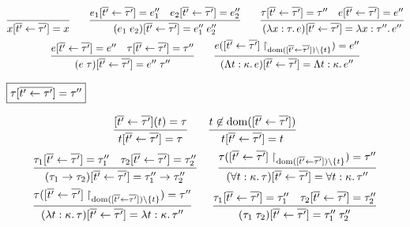 \begin{gather*}
  \infer{x[\overline{t'} \assign \overline{\tau'}] = x}{}
  \hspace{2em}
  \infer{(e_1\; e_2)[\overline{t'} \assign \overline{\tau'}] = e''_1\; e''_2}{
    e_1[\overline{t'} \assign \overline{\tau'}] = e''_1
    &
    e_2[\overline{t'} \assign \overline{\tau'}] = e''_2
  }
  \hspace{2em}
  \infer{(\lambda x: \tau\ldotp e)[\overline{t'} \assign \overline{\tau'}] = \lambda x: \tau''\ldotp e''}{
    \tau[\overline{t'} \assign \overline{\tau'}] = \tau''
    &
    e[\overline{t'} \assign \overline{\tau'}] = e''
  }
  \\
  \infer{(e\; \tau)[\overline{t'} \assign \overline{\tau'}] = e''\; \tau''}{
    e[\overline{t'} \assign \overline{\tau'}] = e''
    &
    \tau[\overline{t'} \assign \overline{\tau'}] = \tau''
  }
  \hspace{2em}
  \infer{(\Lambda t: \kappa\ldotp e)[\overline{t'} \assign \overline{\tau'}] = \Lambda t: \kappa\ldotp e''}{
    e([\overline{t'} \assign \overline{\tau'}]\restrict_{\dom([\overline{t'} \assign \overline{\tau'}]) \rcomplement \{t\}}) = e''
  }
\end{gather*}

$\fbox{$\tau[\overline{t' \gets \tau'}] = \tau''$}$

\begin{gather*}
  \infer{t[\overline{t'} \assign \overline{\tau'}] = \tau}{
    [\overline{t'} \assign \overline{\tau'}](t) = \tau
  }
  \hspace{2em}
  \infer{t[\overline{t'} \assign \overline{\tau'}] = t}{
    t \not\in \dom([\overline{t'} \assign \overline{\tau'}])
  }
  \\
  \infer{(\tau_1 \to \tau_2)[\overline{t'} \assign \overline{\tau'}] = \tau''_1 \to \tau''_2}{
    \tau_1[\overline{t'} \assign \overline{\tau'}] = \tau''_1
    &
    \tau_2[\overline{t'} \assign \overline{\tau'}] = \tau''_2
  }
  \hspace{2em}
  \infer{(\forall t: \kappa\ldotp \tau)[\overline{t'} \assign \overline{\tau'}] = \forall t: \kappa\ldotp \tau''}{
    \tau([\overline{t'} \assign \overline{\tau'}]\restrict_{\dom([\overline{t'} \assign \overline{\tau'}]) \rcomplement \{t\}}) = \tau''
  }
  \\
  \infer{(\lambda t: \kappa\ldotp \tau)[\overline{t'} \assign \overline{\tau'}] = \lambda t: \kappa\ldotp \tau''}{
    \tau([\overline{t'} \assign \overline{\tau'}]\restrict_{\dom([\overline{t'} \assign \overline{\tau'}]) \rcomplement \{t\}}) = \tau''
  }
  \hspace{2em}
  \infer{(\tau_1\; \tau_2)[\overline{t'} \assign \overline{\tau'}] = \tau''_1\; \tau''_2}{
    \tau_1[\overline{t'} \assign \overline{\tau'}] = \tau''_1
    &
    \tau_2[\overline{t'} \assign \overline{\tau'}] = \tau''_2
  }
\end{gather*}

